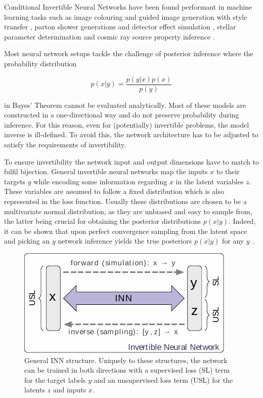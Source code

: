 
Conditional Invertible Neural Networks have been found performant in machine learning tasks such as image colouring and guided image generation with style transfer \cite{cINN_im_gen}, parton shower generations and detector effect simulation \cite{Bellagente_2020}, stellar parameter determination \cite{Ksoll_2020} and cosmic ray source property inference \cite{Bister_2022}.

Most neural network setups tackle the challenge of posterior inference where the probability distribution 

\begin{equation*}
	p(x | y) = \frac{p(y | x) p(x)}{p(y)}
\end{equation*}

in Bayes' Theorem cannot be evaluated analytically. Most of these models are constructed in a one-directional way and do not preserve probability during inference. For this reason, even for (potentially) invertible problems, the model inverse is ill-defined. To avoid this, the network architecture has to be adjusted to satisfy the requirements of invertibility.


To ensure invertibility the network input and output dimensions have to match to fulfil bijection. General invertible neural networks map the inputs $x$ to their targets $y$ while encoding some information regarding $x$ in the latent variables $z$. These variables are assumed to follow a fixed distribution which is also represented in the loss function. Usually these distributions are chosen to be a multivariate normal distribution, as they are unbiased and easy to sample from, the latter being crucial for obtaining the posterior distributions $p(x | y)$. Indeed, it can be shown that upon perfect convergence sampling from the latent space and picking an $y$ network inference yields the true posteriors $p(x | y)$ for any $y$ \cite{INN_Ardizzone}.

\begin{figure}[h!]
	\centering
	\includegraphics[width=0.6\linewidth]{figures/neural_networks/inns.pdf}
	\caption{General INN structure. Uniquely to these structures\protect\footnotemark, the network can be trained in both directions with a supervised loss (SL) term for the target labels $y$ and an unsupervised loss term (USL) for the latents $z$ and inputs $x$. \cite{INN_Ardizzone}}
	\label{fig:inn}
\end{figure}

